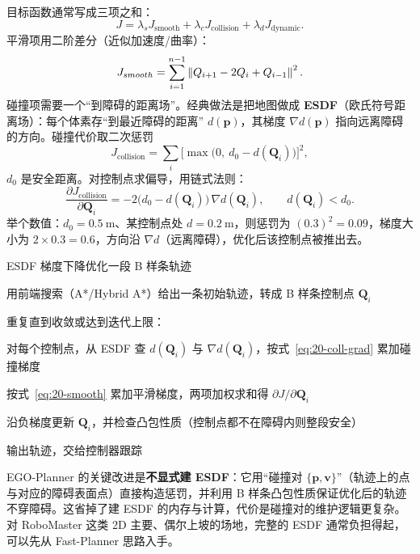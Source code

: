 目标函数通常写成三项之和：
\begin{equation}
  J=\lambda_s J_{\mathrm{smooth}}+\lambda_c J_{\mathrm{collision}}+\lambda_d J_{\mathrm{dynamic}}.
  \label{eq:20-J}
\end{equation}
平滑项用二阶差分（近似加速度/曲率）：
\begin{equation}
  J_{smooth}=\sum_{i=1}^{n-1}\left\lVert Q_{i+1}-2Q_i+Q_{i-1} \right\rVert^2.
  \label{eq:20-smooth}
\end{equation}
碰撞项需要一个“到障碍的距离场”。经典做法是把地图做成 \textbf{ESDF}（欧氏符号距离场）\cite{oleynikova2017voxblox}：每个体素存“到最近障碍的距离” $d(\bm{p})$，其梯度 $\nabla d(\bm{p})$ 指向远离障碍的方向。碰撞代价取二次惩罚
\begin{equation}
  J_{\mathrm{collision}}=\sum_{i}\bigl[\max\bigl(0,\ d_0-d(\bm{Q}_i)\bigr)\bigr]^2,
  \label{eq:20-coll}
\end{equation}
$d_0$ 是安全距离。对控制点求偏导，用链式法则：
\begin{equation}
  \frac{\partial J_{\mathrm{collision}}}{\partial \bm{Q}_i}
  =-2\bigl(d_0-d(\bm{Q}_i)\bigr)\,\nabla d(\bm{Q}_i),
  \qquad d(\bm{Q}_i)<d_0.
  \label{eq:20-coll-grad}
\end{equation}
举个数值：$d_0=0.5\ \mathrm{m}$、某控制点处 $d=0.2\ \mathrm{m}$，则惩罚为 $(0.3)^2=0.09$，梯度大小为 $2\times0.3=0.6$，方向沿 $\nabla d$（远离障碍），优化后该控制点被推出去。

\begin{pseudo}{ESDF 梯度下降优化一段 B 样条轨迹}
  \item 用前端搜索（A*/Hybrid A*）给出一条初始轨迹，转成 B 样条控制点 $\bm{Q}_i$
  \item 重复直到收敛或达到迭代上限：
  \item \quad 对每个控制点，从 ESDF 查 $d(\bm{Q}_i)$ 与 $\nabla d(\bm{Q}_i)$，按式~\eqref{eq:20-coll-grad} 累加碰撞梯度
  \item \quad 按式~\eqref{eq:20-smooth} 累加平滑梯度，两项加权求和得 $\partial J/\partial\bm{Q}_i$
  \item \quad 沿负梯度更新 $\bm{Q}_i$，并检查凸包性质（控制点都不在障碍内则整段安全）
  \item 输出轨迹，交给控制器跟踪
\end{pseudo}

EGO-Planner\cite{zhou2021egoplanner} 的关键改进是\textbf{不显式建 ESDF}：它用“碰撞对 $\{\bm{p},\bm{v}\}$”（轨迹上的点与对应的障碍表面点）直接构造惩罚，并利用 B 样条凸包性质保证优化后的轨迹不穿障碍。这省掉了建 ESDF 的内存与计算，代价是碰撞对的维护逻辑更复杂。对 RoboMaster 这类 2D 主要、偶尔上坡的场地，完整的 ESDF 通常负担得起，可以先从 Fast-Planner 思路入手。

